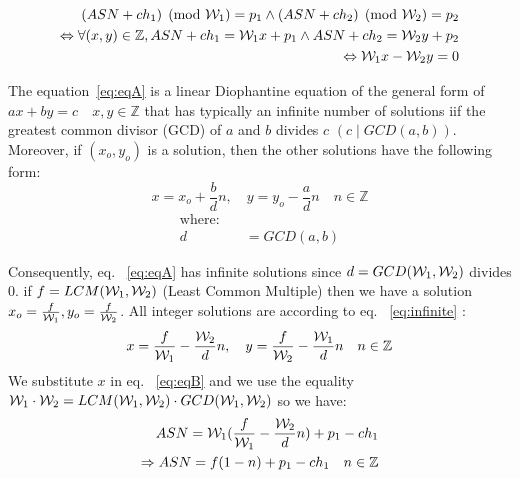 \documentclass{article}
\begin{document}

\begin{eqnarray} 
	(ASN+ch_1)\pmod{\mathcal{W}_1}=p_1  \wedge  (ASN+ch_2)\pmod{\mathcal{W}_2}=p_2 \\
	\Leftrightarrow  \forall(x,y) \in \mathbb{Z},  ASN+ch_1 =\mathcal{W}_1 x+p_1 \wedge ASN +ch_2 =\mathcal{W}_2 y+p_2  \label{eq:eqB} \\ 
   \Leftrightarrow  \mathcal{W}_1 x-\mathcal{W}_2 y=0 \label{eq:eqA}
\end{eqnarray}

The equation~\ref{eq:eqA} is a linear Diophantine equation  of the general form of $ ax+by=c \quad x,y \in \mathbb{Z}$ that has typically an infinite number of  solutions iif the greatest common divisor (GCD) of $a$ and $b$ divides $c$ $(c \mid GCD(a,b))$. Moreover, if $(x_o, y_o)$ is a solution, then the other solutions have the following form:  
\begin{equation}
	x=x_{o}+\frac{b}{d}n  ,\quad 
    y=y_{o}-\frac{a}{d}n \quad n \in \mathbb{Z}
    \label{eq:infinite}
 \end{equation}
\begin{align*}
		\text{where:}\quad \\
        d&=GCD(a,b)
\end{align*}


Consequently, eq. ~\ref{eq:eqA} has infinite solutions since $d=GCD(\mathcal{W}_1,\mathcal{W}_2)$ divides $0$. 
if $f=LCM(\mathcal{W}_1,\mathcal{W}_2)$ (Least Common Multiple) then we have a solution  $x_o=\frac{f}{\mathcal{W}_1}, y_o=\frac{f}{\mathcal{W}_2}$. All integer solutions are according to eq. ~\ref{eq:infinite} :
\begin{eqnarray}
x=\frac{f}{\mathcal{W}_1} -\frac{\mathcal{W}_2}{d}n , \quad 
y=\frac{f}{\mathcal{W}_2} -\frac{\mathcal{W}_1}{d}n \quad n \in \mathbb{Z}
\end{eqnarray}
We substitute $x$ in eq. ~\ref{eq:eqB} and we use the equality $\mathcal{W}_1 \cdot \mathcal{W}_2 =LCM(\mathcal{W}_1,\mathcal{W}_2) \cdot GCD(\mathcal{W}_1,\mathcal{W}_2)  $ so we have:
\begin{eqnarray}
ASN=\mathcal{W}_1(\frac{f}{\mathcal{W}_1} -\frac{\mathcal{W}_2}{d}n)+p_1-ch_1\\ 
\Rightarrow ASN=f(1-n)+p_1-ch_1 \quad n \in \mathbb{Z}
\end{eqnarray}
\end{document}
